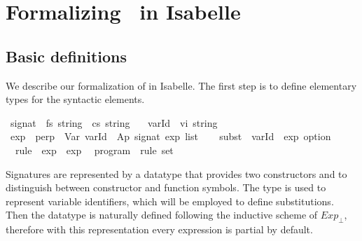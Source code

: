 \documentclass{llncs}
\newenvironment{isacode}
{\begin{list}{}{
\setlength{\leftmargin}{4pt}
\setlength{\rightmargin}{0pt}
\setlength{\listparindent}{0pt}\raggedright
\setlength{\itemsep}{0pt}
\setlength{\parsep}{0pt}
\normalfont\ttfamily }\item[]}
{\end{list}}
\begin{document}

\section{Formalizing \crwl\ in Isabelle}\label{formalizing}
\subsection{Basic definitions}
\label{sec:formalizing:basic}












We describe our formalization of \crwl{} in Isabelle. The first step
is to define elementary types for the syntactic elements.


\medskip

\begin{minipage}{\linewidth}
\begin{isacode}
\isamarkupfalse \ signat\ {\isacharequal}\ fs\ string\ {\isacharbar}\ cs\ string\ \ \isanewline
{}\isamarkupfalse \ varId\ {\isacharequal}\ vi\ string\isanewline
{}\isamarkupfalse \ exp\ {\isacharequal}\ perp\ {\isacharbar}\ Var\ varId\ {\isacharbar}\ Ap\ signat\ {\isachardoublequoteopen}exp\ list{\isachardoublequoteclose}\isanewline
{}\isamarkupfalse \ \isanewline
\ \ subst\ {\isacharequal}\ {\isachardoublequoteopen}varId\ {\isasymRightarrow}\ exp\ option{\isachardoublequoteclose}\isanewline
\ \ rule\ {\isacharequal}\ {\isachardoublequoteopen}exp\ {\isacharasterisk}\ exp{\isachardoublequoteclose}\isanewline
\ \ program\ {\isacharequal}\ {\isachardoublequoteopen}rule\ set{\isachardoublequoteclose}\end{isacode}
\end{minipage}


\medskip

\noindent Signatures are represented by a datatype that provides two
constructors  and  to distinguish between
constructor and function symbols.
The type  is used to represent variable identifiers,
which will be employed to define substitutions. Then the datatype
 is naturally defined following the inductive scheme of
$Exp_\perp$, therefore with this representation every expression is
partial by default.
\end{document}
